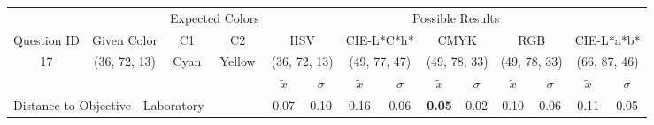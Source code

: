 \begin{table}[H]
  \resizebox{\textwidth}{!} {
  \begin{tabular}{lccccccccccccc}
    \hline
    \multicolumn{1}{c}{}                              &                                      & \multicolumn{2}{c}{Expected Colors}                   & \multicolumn{10}{c}{Possible Results}                                                                                                                                                                                                                                                                                        \\ \cline{3-14}
    \multicolumn{1}{c}{\multirow{-2}{*}{Question ID}} & \multirow{-2}{*}{Given Color}        & C1                       & C2                         & \multicolumn{2}{c}{HSV}                                        & \multicolumn{2}{c}{CIE-L*C*h*}                                 & \multicolumn{2}{c}{CMYK}                                       & \multicolumn{2}{c}{RGB}                                        & \multicolumn{2}{c}{CIE-L*a*b*}                                 \\ \hline
    \multicolumn{1}{c}{17}                             & \cellcolor[HTML]{00FF00}(36, 72, 13) & \multicolumn{1}{c|}{Cyan} & \multicolumn{1}{c|}{Yellow}  & \multicolumn{2}{c|}{\cellcolor[HTML]{00FF00}(36, 72, 13)}      & \multicolumn{2}{c|}{\cellcolor[HTML]{6EFFA3}(49, 77, 47)}       & \multicolumn{2}{c|}{\cellcolor[HTML]{80FF80}(49, 78, 33)}       & \multicolumn{2}{c|}{\cellcolor[HTML]{80FF80}(49, 78, 33)}       & \multicolumn{2}{c|}{\cellcolor[HTML]{C4FF9E}(66, 87, 46)}       \\ \hline
                                                      & \multicolumn{1}{l}{}                 & \multicolumn{1}{l}{}     & \multicolumn{1}{l}{}       & \multicolumn{1}{c}{$\tilde{x}$} & \multicolumn{1}{c}{$\sigma$} & \multicolumn{1}{c}{$\tilde{x}$} & \multicolumn{1}{c}{$\sigma$} & \multicolumn{1}{c}{$\tilde{x}$} & \multicolumn{1}{c}{$\sigma$} & \multicolumn{1}{c}{$\tilde{x}$} & \multicolumn{1}{c}{$\sigma$} & \multicolumn{1}{c}{$\tilde{x}$} & \multicolumn{1}{c}{$\sigma$} \\ \hline
    \multicolumn{4}{l}{Distance to Objective - Laboratory}                                                                                           & \multicolumn{1}{|c}{0.07}       & \multicolumn{1}{c|}{0.10}    & \multicolumn{1}{|c}{0.16}       & \multicolumn{1}{c|}{0.06}    & \multicolumn{1}{|c}{\textbf{0.05}}       & \multicolumn{1}{c|}{0.02}    & \multicolumn{1}{|c}{0.10}       & \multicolumn{1}{c|}{0.06}    & \multicolumn{1}{|c}{0.11}       & \multicolumn{1}{c|}{0.05}    \\

\end{tabular}}
\end{table}
